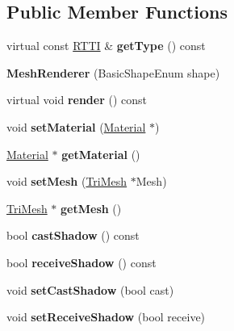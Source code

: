 \subsection*{Public Member Functions}
\begin{DoxyCompactItemize}
\item 
\hypertarget{class_mesh_renderer_a4430f795bd67ba8aca7b57bab488971b}{
virtual const \hyperlink{class_r_t_t_i}{RTTI} \& {\bfseries getType} () const }
\label{class_mesh_renderer_a4430f795bd67ba8aca7b57bab488971b}

\item 
\hypertarget{class_mesh_renderer_a81dd19d7a59f2d8bb086ab939b19a4c5}{
{\bfseries MeshRenderer} (BasicShapeEnum shape)}
\label{class_mesh_renderer_a81dd19d7a59f2d8bb086ab939b19a4c5}

\item 
\hypertarget{class_mesh_renderer_a5a811c3fbbdd31edef0ef23c3219c35e}{
virtual void {\bfseries render} () const }
\label{class_mesh_renderer_a5a811c3fbbdd31edef0ef23c3219c35e}

\item 
\hypertarget{class_mesh_renderer_ae7f66301b96360025adbd901465ef9d5}{
void {\bfseries setMaterial} (\hyperlink{class_material}{Material} $\ast$)}
\label{class_mesh_renderer_ae7f66301b96360025adbd901465ef9d5}

\item 
\hypertarget{class_mesh_renderer_a75c264da40ce0ac85919736c2905203e}{
\hyperlink{class_material}{Material} $\ast$ {\bfseries getMaterial} ()}
\label{class_mesh_renderer_a75c264da40ce0ac85919736c2905203e}

\item 
\hypertarget{class_mesh_renderer_a16a30a96dccb8b557247322e247d4a8f}{
void {\bfseries setMesh} (\hyperlink{class_t_r3_d_1_1_tri_mesh}{TriMesh} $\ast$Mesh)}
\label{class_mesh_renderer_a16a30a96dccb8b557247322e247d4a8f}

\item 
\hypertarget{class_mesh_renderer_ab66e3b92d702f2b93d3d3afb74807d24}{
\hyperlink{class_t_r3_d_1_1_tri_mesh}{TriMesh} $\ast$ {\bfseries getMesh} ()}
\label{class_mesh_renderer_ab66e3b92d702f2b93d3d3afb74807d24}

\item 
\hypertarget{class_mesh_renderer_a18e4146b5a29d4916dca693f39db2233}{
bool {\bfseries castShadow} () const }
\label{class_mesh_renderer_a18e4146b5a29d4916dca693f39db2233}

\item 
\hypertarget{class_mesh_renderer_ac150da9be57d1616c1a5ccba374fa2fb}{
bool {\bfseries receiveShadow} () const }
\label{class_mesh_renderer_ac150da9be57d1616c1a5ccba374fa2fb}

\item 
\hypertarget{class_mesh_renderer_a58101967c2a4cd65513aeb4b940314ec}{
void {\bfseries setCastShadow} (bool cast)}
\label{class_mesh_renderer_a58101967c2a4cd65513aeb4b940314ec}

\item 
\hypertarget{class_mesh_renderer_abf4aa0764b41e79388905f6c23457d00}{
void {\bfseries setReceiveShadow} (bool receive)}
\label{class_mesh_renderer_abf4aa0764b41e79388905f6c23457d00}

\end{DoxyCompactItemize}
